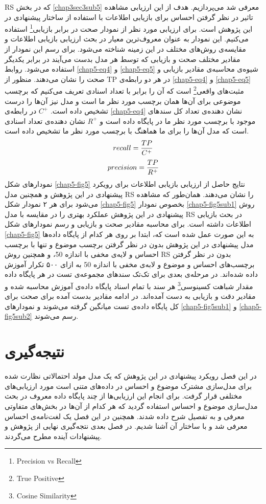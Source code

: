 RS
که در بخش
\ref{chap3sec3sub5}
معرفی‌ شد می‌‌پردازیم. هدف از این ارزیابی مشاهده تاثیر در نظر گرفتن احساس برای بازیابی اطلاعات با استفاده از ساختار پیشنهادی در این پژوهش است. برای ارزیابی مورد نظر از نمودار صحت در برابر بازیابی\footnote{Precision vs Recall}
استفاده می‌‌کنیم. این نمودار به عنوان معروف‌ترین معیار در بحث ارزیابی بازیابی اطلاعات و مقایسه‌ی روش‌های مختلف در این زمینه شناخته می‌‌شود. برای رسم این نمودار از مقادیر مختلف صحت و بازیابی که توسط هر مدل بدست می‌‌آیند در برابر یکدیگر استفاده می‌‌شود. روابط
\ref{chap5-eq4}
و
\ref{chap5-eq5}
شیوه‌ی محاسبه‌ی مقادیر بازیابی و صحت را نشان می‌‌دهند. منظور از
TP
در هر دو رابطه‌ی
\ref{chap5-eq4}
و
\ref{chap5-eq5}
مثبت‌های واقعی‌\footnote{True Positive}
 است که آن را برابر با تعداد اسنادی تعریف می‌‌کنیم که برچسب موضوعی برای آن‌ها همان برچسب مورد نظر ما است و مدل نیز آن‌ها را 
درست تشخیص داده است.
$C^+$
در رابطه‌ی
\ref{chap5-eq4}
نشان دهنده‌ی تعداد کل سندهای موجود با برچسب مورد نظر ما در پایگاه داده است و
$R^+$
نشان دهنده‌ی تعداد اسنادی است که مدل آن‌ها را برای ما هماهنگ با برچسب مورد نظر ما تشخیص داده است.
\begin{align}
	\centering
	\label{chap5-eq4}
	recall = \dfrac{TP}{C^+}
\end{align}
\begin{align}
	\centering
	\label{chap5-eq5}
	precision = \dfrac{TP}{R^+}
\end{align}
نمودار‌های شکل
\ref{chap5-fig5}
نتایج حاصل از ارزیابی بازیابی اطلاعات برای رویکرد پیشنهادی در این پژوهش و همچنین مدل
RS
را نشان می‌‌دهند. همان‌طور که مشاهده می‌‌شود برای هر ۲ نمودار شکل
\ref{chap5-fig5}
بخصوص نمودار
\ref{chap5-fig5sub1}
روش پیشنهادی در این پژوهش عملکرد بهتری را در مقایسه با مدل
RS
در بحث بازیابی اطلاعات داشته است. برای محاسبه مقادیر صحت و بازیابی و رسم نمودار‌های شکل
\ref{chap5-fig5}
به این صورت عمل شده است که، ابتدا بر روی هر کدام از پایگاه داده‌ها مدل پیشنهادی در این پژوهش بدون در نظر گرفتن برچسب موضوع و تنها با برچسب احساس و لایه‌ی مخفی با اندازه 50، و همچنین روش
RS
بدون در نظر گرفتن برچسب‌های احساس و موضوع و لابه‌ی مخفی با اندازه 50 به ازای ۵۰۰ تکرار آموزش داده شده‌اند. در مرحله‌ی بعدی برای تک‌تک سند‌های مجموعه‌ی تست در هر پایگاه داده مقدار شباهت کسینوسی\footnote{Cosine Similarity}
هر سند با تمام اسناد پایگاه داده‌ی آموزش محاسبه شده و مقادیر دقت و بازیابی به دست آمده‌اند. در ادامه مقادیر بدست آمده برای صحت برای کل پایگاه داده‌ی تست میانگین گرفته می‌‌شوند و نمودار‌های
\ref{chap5-fig5sub1}
و
\ref{chap5-fig5sub2}
رسم می‌‌شوند.

\section{نتیجه‌گیری}
در این فصل رویکرد پیشنهادی در این پژوهش که یک مدل مولد احتمالاتی نظارت شده برای مدل‌سازی مشترک موضوع و احساس در داده‌های متنی است مورد ارزیابی‌های مختلفی‌ قرار گرفت.  برای انجام این ارزیابی‌ها از چند پایگاه داده معروف در بحث مدل‌سازی موضوع و احساس استفاده گردید که هر کدام از آن‌ها در بخش‌های متفاوتی معرفی‌ و به تفصیل شرح داده شدند. همچنین در این فصل یک لغت‌نامه‌ی احساس معرفی‌ شد و با ساختار آن آشنا شدیم. در فصل بعدی نتجه‌گیری نهایی از پژوهش و پیشنهادات آینده مطرح می‌گردند.
